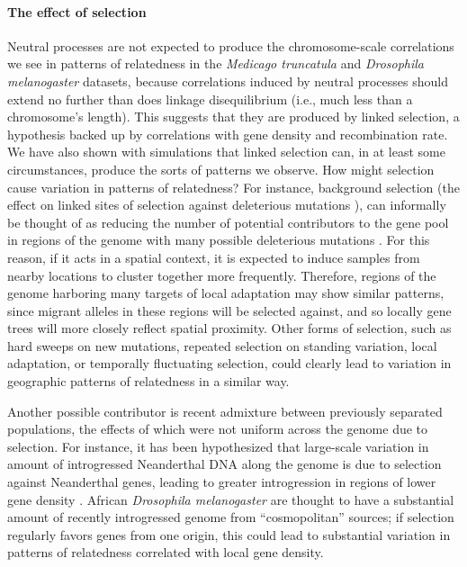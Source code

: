 \documentclass[11pt, oneside]{article}   	%
\newcommand\citet{\cite}
\newcommand\citep{\cite}
\renewcommand{\revpoint}[2]{\relax}
\renewcommand{\llabel}[1]{\relax}
\begin{document}
\paragraph{The effect of selection}
Neutral processes are not expected to produce the chromosome-scale correlations we see in
patterns of relatedness 
in the \textit{Medicago truncatula} and \textit{Drosophila melanogaster} datasets, \llabel{ll:not_neutral}
because correlations induced by neutral processes 
should extend no further than does linkage disequilibrium
(i.e., much less than a chromosome's length).
This suggests that they are produced by linked selection,
a hypothesis backed up by correlations with gene density and recombination rate.
We have also shown with simulations that linked selection can, in at least some circumstances,
produce the sorts of patterns we observe.
How might selection cause variation in patterns of relatedness?
For instance, background selection
(the effect on linked sites of selection against deleterious mutations
\citet{charlesworth1993effect,charlesworth2013background}),
can informally be thought of as reducing the number of potential contributors to the gene pool 
in regions of the genome with many possible deleterious mutations \citep{hudson1995deleterious}.
For this reason, if it acts in a spatial context, it is expected to induce samples from nearby locations to cluster together more frequently.
Therefore, regions of the genome harboring many targets of local adaptation may show similar patterns,
since migrant alleles in these regions will be selected against,
and so locally gene trees will more closely reflect spatial proximity.
Other forms of selection, such as hard sweeps on new mutations,
repeated selection on standing variation, local adaptation,
or temporally fluctuating selection,
could clearly lead to variation 
in geographic patterns of relatedness in a similar way.

Another possible contributor is recent admixture between previously separated populations,
the effects of which were not uniform across the genome due to selection. \revpoint{2}{6}
For instance, it has been hypothesized that large-scale variation in amount of introgressed Neanderthal DNA along the genome
is due to selection against Neanderthal genes, leading to greater introgression in regions of lower gene density
\citep{harris2016genetic,juric2016strength}.
African \textit{Drosophila melanogaster} are thought to have a substantial amount of recently introgressed genome from ``cosmopolitan'' sources;
if selection regularly favors genes from one origin,
this could lead to substantial variation in patterns of relatedness correlated with local gene density.
\end{document}

